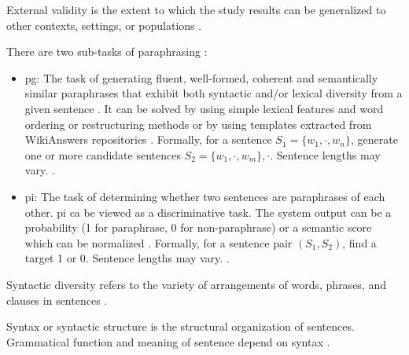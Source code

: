 \begin{definition}
    External validity is the extent to which the study results can be generalized 
    to other contexts, settings, or populations \cite{master_thesis_paraphrasing_2024}.
\end{definition}

\begin{definition}
    There are two sub-tasks of paraphrasing \cite{palivela_optimization_2021}:
    \begin{itemize}
        \item \ac{pg}: The task of generating fluent, well-formed, coherent and semantically similar paraphrases 
        that exhibit both syntactic and/or lexical diversity from a given sentence \cite{palivela_optimization_2021,kurt_pehlivanoglu_comparative_2024}. 
        It can be solved by using simple lexical features and word ordering or restructuring methods or 
        by using templates extracted from WikiAnswers repositories \cite{palivela_optimization_2021}.
        Formally, for a sentence $S_1=\{w_1, \cdot, w_n\}$, generate one or more candidate sentences $S_2=\{w_1, \cdot, w_m\}, \cdot$.
        Sentence lengths may vary. \cite{palivela_optimization_2021}.
        \item \ac{pi}: The task of determining whether two sentences are paraphrases of each other.
        \ac{pi} ca be viewed as a discriminative task. The system output can be a probability (1 for paraphrase, 0 for non-paraphrase) 
        or a semantic score which can be normalized \cite{palivela_optimization_2021}.
        Formally, for a sentence pair $(S_1, S_2)$, find a target 1 or 0. Sentence lengths may vary. \cite{palivela_optimization_2021}.
    \end{itemize}
\end{definition}

\begin{definition}
    Syntactic diversity refers to the variety of arrangements of words, phrases, and clauses in sentences \cite{kurt_pehlivanoglu_comparative_2024}.
\end{definition}

\begin{definition}
    [Syntax]
    Syntax or syntactic structure is the structural organization of sentences.
    Grammatical function and meaning of sentence depend on syntax \cite{kurt_pehlivanoglu_comparative_2024}.
\end{definition}

